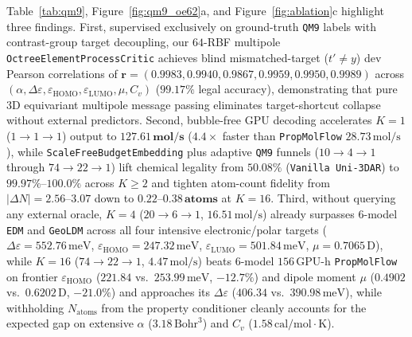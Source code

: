 \documentclass[11pt,a4paper]{article}
\begin{document}
Table~\ref{tab:qm9}, Figure~\ref{fig:qm9_oe62}a, and Figure~\ref{fig:ablation}c highlight three findings. First, supervised exclusively on ground-truth \texttt{QM9} labels with contrast-group target decoupling, our $64$-RBF multipole \texttt{Octree\allowbreak Element\allowbreak ProcessCritic} achieves blind mismatched-target ($t' \ne y$) dev Pearson correlations of $\mathbf{r = (0.9983, 0.9940, 0.9867, 0.9959, 0.9950, 0.9989)}$ across $(\alpha, \Delta\varepsilon, \varepsilon_{\text{HOMO}}, \varepsilon_{\text{LUMO}}, \mu, C_v)$ ($99.17\%$ legal accuracy), demonstrating that pure 3D equivariant multipole message passing eliminates target-shortcut collapse without external predictors. Second, bubble-free GPU decoding accelerates $K=1$ ($1\to 1\to 1$) output to $\mathbf{127.61\,\text{mol/s}}$ ($4.4\times$ faster than \texttt{PropMolFlow} $28.73\,\text{mol/s}$), while \texttt{ScaleFree\allowbreak Budget\allowbreak Embedding} plus adaptive \texttt{QM9} funnels ($10\to 4\to 1$ through $74\to 22\to 1$) lift chemical legality from $50.08\%$ (\texttt{Vanilla Uni-3DAR}) to $\mathbf{99.97\%\text{--}100.0\%}$ across $K \ge 2$ and tighten atom-count fidelity from $|\Delta N| = 2.56\text{--}3.07$ down to $\mathbf{0.22\text{--}0.38\,\text{atoms}}$ at $K=16$. Third, without querying any external oracle, $K=4$ ($20\to 6\to 1$, $16.51\,\text{mol/s}$) already surpasses $6$-model \texttt{EDM} and \texttt{GeoLDM} across all four intensive electronic/polar targets ($\Delta\varepsilon=552.76\,\text{meV}$, $\varepsilon_{\text{HOMO}}=247.32\,\text{meV}$, $\varepsilon_{\text{LUMO}}=501.84\,\text{meV}$, $\mu=0.7065\,\text{D}$), while $K=16$ ($74\to 22\to 1$, $4.47\,\text{mol/s}$) beats $6$-model $156\,\text{GPU-h}$ \texttt{PropMolFlow} on frontier $\varepsilon_{\text{HOMO}}$ ($\mathbf{221.84}$ vs.\ $253.99\,\text{meV}$, $\mathbf{-12.7\%}$) and dipole moment $\mu$ ($\mathbf{0.4902}$ vs.\ $0.6202\,\text{D}$, $\mathbf{-21.0\%}$) and approaches its $\Delta\varepsilon$ ($406.34$ vs.\ $390.98\,\text{meV}$), while withholding $N_{\text{atoms}}$ from the property conditioner cleanly accounts for the expected gap on extensive $\alpha$ ($3.18\,\text{Bohr}^3$) and $C_v$ ($1.58\,\text{cal/mol}\cdot\text{K}$).
\end{document}
